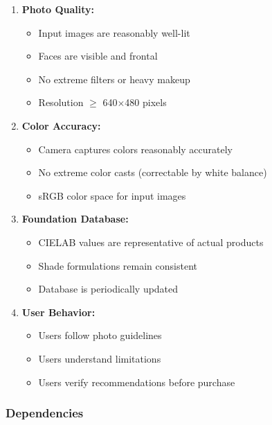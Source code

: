 \begin{enumerate}
    \item \textbf{Photo Quality:}
    \begin{itemize}
        \item Input images are reasonably well-lit
        \item Faces are visible and frontal
        \item No extreme filters or heavy makeup
        \item Resolution $\geq$ 640$\times$480 pixels
    \end{itemize}
    
    \item \textbf{Color Accuracy:}
    \begin{itemize}
        \item Camera captures colors reasonably accurately
        \item No extreme color casts (correctable by white balance)
        \item sRGB color space for input images
    \end{itemize}
    
    \item \textbf{Foundation Database:}
    \begin{itemize}
        \item CIELAB values are representative of actual products
        \item Shade formulations remain consistent
        \item Database is periodically updated
    \end{itemize}
    
    \item \textbf{User Behavior:}
    \begin{itemize}
        \item Users follow photo guidelines
        \item Users understand limitations
        \item Users verify recommendations before purchase
    \end{itemize}
\end{enumerate}

\subsubsection{Dependencies}

